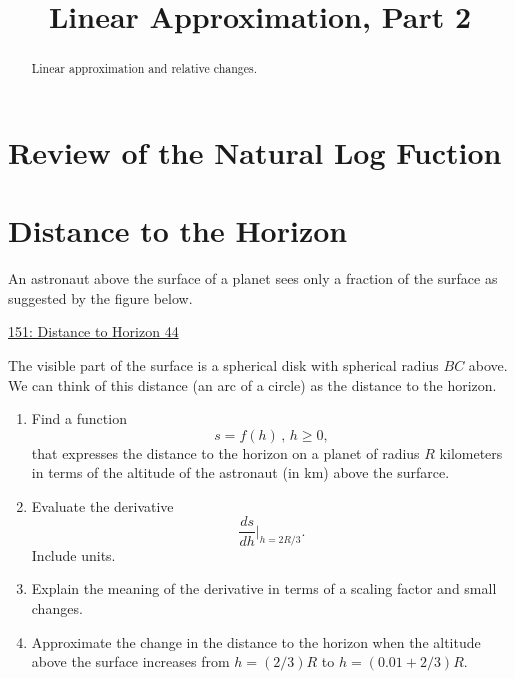 \documentclass{ximera}
\title{Linear Approximation, Part 2}
\begin{document}
\begin{abstract}
Linear approximation and relative changes.
\end{abstract}
\maketitle


\section{Review of the Natural Log Fuction}








\section{Distance to the Horizon}
\begin{example} \label{ExKdfdKREGER}
An astronaut above the surface of a planet sees only a fraction of the surface as suggested by the figure below.

\begin{onlineOnly}
    \begin{center}
\end{center}
\end{onlineOnly}

\href{https://www.desmos.com/calculator/8shf1msp4m}{151: Distance to Horizon 44}

The visible part of the surface is a spherical disk with spherical radius $BC$ above. We can think of this distance (an arc of a circle) as the distance to the horizon.

\begin{enumerate}
\item Find a function 
\[
   s = f(h) \, , \, h\geq 0,
\]
that expresses the distance to the horizon on a planet of radius $R$ kilometers in terms of the altitude of the astronaut (in km) above the surfarce.

\item Evaluate the derivative
\[
      \frac{ds}{dh} \Big|_{h=2R/3} .
\]
Include units.

\item Explain the meaning of the derivative in terms of a scaling factor and small changes.

\item Approximate the change in the distance to the horizon when the altitude above the surface increases from $h=(2/3)R$ to $h=(0.01 + 2/3)R$.
\end{enumerate}
\end{example}
\end{document}
